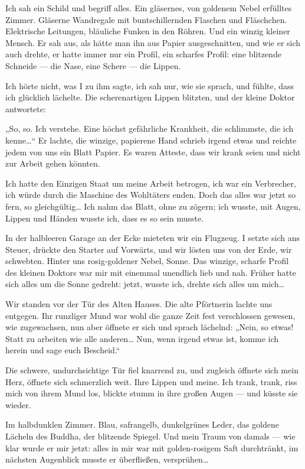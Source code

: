 Ich sah
ein Schild  und begriff alles.
%
Ein gläsernes, von
goldenem Nebel erfülltes Zimmer. Gläserne Wandregale mit
buntschillernden Flaschen und Fläschchen. Elektrische Leitungen,
bläuliche Funken in den Röhren. Und ein winzig kleiner Mensch. Er
sah aus, als hätte man ihn aus Papier ausgeschnitten, und wie er
sich auch drehte, er hatte immer nur ein Profil, ein scharfes
Profil: eine blitzende Schneide — die Nase, eine Schere — die
Lippen.

Ich hörte nicht, was I zu ihm sagte, ich sah nur, wie sie sprach,
und fühlte, dass ich glücklich lächelte. Die scherenartigen Lippen
blitzten, und der kleine Doktor antwortete:

„So, so. Ich verstehe.
Eine höchst gefährliche Krankheit, die schlimmste, die ich
kenne\ldots{}“ Er lachte, die winzige, papierene Hand schrieb irgend
etwas und reichte jedem von uns ein Blatt Papier. Es waren Atteste,
dass wir krank seien und nicht zur Arbeit gehen könnten.

Ich hatte
den Einzigen Staat um meine Arbeit betrogen, ich war ein
Verbrecher, ich würde durch die Maschine des Wohltäters enden. Doch
das alles war jetzt so fern, so gleichgültig\ldots{} Ich nahm das Blatt,
ohne zu zögern; ich wusste, mit Augen, Lippen und Händen wusste
ich, dass es so sein musste.

In der halbleeren Garage an der Ecke mieteten wir ein Flugzeug. I
setzte sich ans Steuer, drückte den Starter auf
Vorwärts, und wir lösten uns von der Erde, wir schwebten. Hinter
uns rosig-goldener Nebel, Sonne. Das winzige, scharfe Profil des
kleinen Doktors war mir mit einemmal unendlich lieb und nah. Früher
hatte sich alles um die Sonne gedreht: jetzt, wusste ich, drehte
sich alles um mich\ldots{}

Wir standen vor der Tür des Alten Hauses. Die alte Pförtnerin
lachte uns entgegen. Ihr runzliger Mund war wohl die ganze Zeit
fest verschlossen gewesen, wie zugewachsen, nun aber öffnete er
sich und sprach lächelnd: „Nein, so etwas! Statt zu arbeiten wie
alle anderen\ldots{} Nun, wenn irgend etwas ist, komme ich herein und
sage euch Bescheid.“

Die schwere, undurchsichtige Tür fiel knarrend zu, und zugleich
öffnete sich mein Herz, öffnete sich schmerzlich weit. Ihre Lippen
und meine. Ich trank, trank, riss mich von ihrem Mund los, blickte
stumm in ihre großen Augen — und küsste sie wieder.

Im halbdunklen Zimmer. Blau, safrangelb, dunkelgrünes Leder, das
goldene Lächeln des Buddha, der blitzende Spiegel. Und mein Traum
von damals — wie klar wurde er mir jetzt: alles in mir war mit
golden-rosigem Saft durchtränkt, im nächsten Augenblick musste er
überfließen, versprühen\ldots{}

